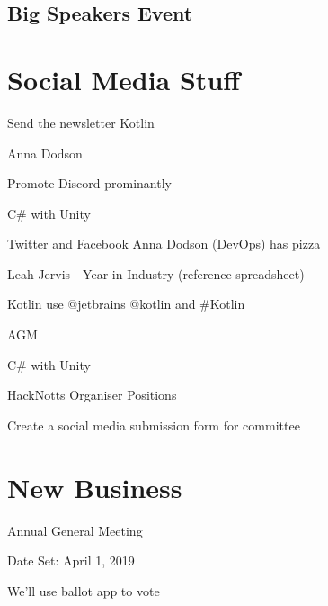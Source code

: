 \documentclass[11pt,hacksoc]{meetingmins}
\begin{document}
\subsection{Big Speakers Event}
\begin{hiddensubitems}
	\item
	
	\item

\end{hiddensubitems}
	

\section{Social Media Stuff}
\begin{items}
	\item
	
	\item
	Send the newsletter
		\subitem
		Kotlin
		
		\subitem
		Anna Dodson
		
		\subitem
		Promote Discord prominantly
		
		\subitem
		C\# with Unity
		
	\item
	Twitter and Facebook
		\subitem
		Anna Dodson (DevOps) has pizza
		
		\subitem
		Leah Jervis - Year in Industry (reference spreadsheet)
		
		\subitem
		Kotlin use @jetbrains @kotlin and \#Kotlin
		
		\subitem
		AGM
		
		\subitem
		C\# with Unity
		
		\subitem
		HackNotts Organiser Positions
	
	\item
	Create a social media submission form for committee
	
\end{items}

\section{New Business}
\begin{items}
	\item
	Annual General Meeting
	
	\item
	Date Set: April 1, 2019
	
	\item
	
	\item
	We'll use ballot app to vote
	
	\item
	
	\item
	
\end{items}

\vspace{1em}
\end{document}
